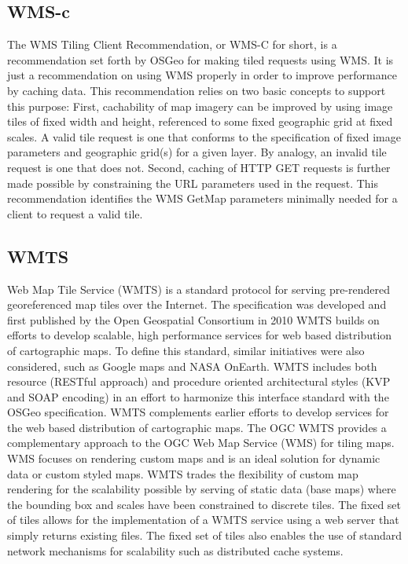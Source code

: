 \documentclass[11pt,a4paper,titlepage,oneside]{report}
\begin{document}
  \subsection{WMS-c}
    The WMS Tiling Client Recommendation, or WMS-C for short, is a recommendation set forth by OSGeo for making tiled requests using WMS. It is just a recommendation on using WMS properly in order to improve performance by caching data.
    This recommendation relies on two basic concepts to support this purpose: First, cachability of map imagery can be improved by using image tiles of fixed width and height, referenced to some fixed geographic grid at fixed scales. A valid tile request is one that conforms to the specification of fixed image parameters and geographic grid(s) for a given layer. By analogy, an invalid tile request is one that does not.
    Second, caching of HTTP GET requests is further made possible by constraining the URL parameters used in the request. This recommendation identifies the WMS GetMap parameters minimally needed for a client to request a valid tile.

  \subsection{WMTS}
    Web Map Tile Service (WMTS) is a standard protocol for serving pre-rendered georeferenced map tiles over the Internet. The specification was developed and first published by the Open Geospatial Consortium in 2010
    WMTS builds on efforts to develop scalable, high performance services for web based distribution of cartographic maps. To define this standard, similar initiatives were also considered, such as Google maps and NASA OnEarth. WMTS includes both resource (RESTful approach) and procedure oriented architectural styles (KVP and SOAP encoding) in an effort to harmonize this interface standard with the OSGeo specification.
    WMTS complements earlier efforts to develop services for the web based distribution of cartographic maps. The OGC WMTS provides a complementary approach to the OGC Web Map Service (WMS) for tiling maps. WMS focuses on rendering custom maps and is an ideal solution for dynamic data or custom styled maps. WMTS trades the flexibility of custom map rendering for the scalability possible by serving of static data (base maps) where the bounding box and scales have been constrained to discrete tiles. The fixed set of tiles allows for the implementation of a WMTS service using a web server that simply returns existing files. The fixed set of tiles also enables the use of standard network mechanisms for scalability such as distributed cache systems.
\end{document}
